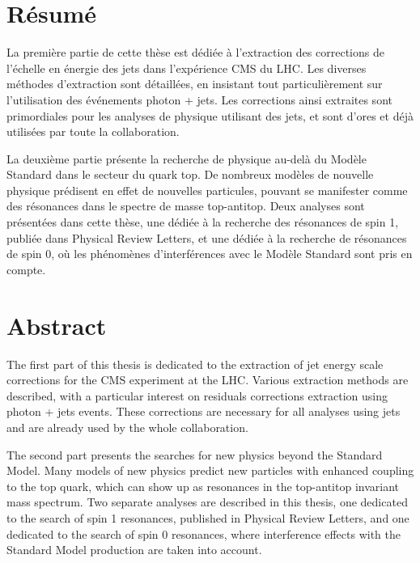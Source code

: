 \begingroup
\let\clearpage\relax
\let\cleardoublepage\relax
\let\cleardoublepage\relax

\chapter*{Résumé}

La première partie de cette thèse est dédiée à l'extraction des corrections de l'échelle en énergie des jets dans l'expérience CMS du LHC. Les diverses méthodes d'extraction sont détaillées, en insistant tout particulièrement sur l'utilisation des événements photon + jets. Les corrections ainsi extraites sont primordiales pour les analyses de physique utilisant des jets, et sont d'ores et déjà utilisées par toute la collaboration.

La deuxième partie présente la recherche de physique au-delà du Modèle Standard dans le secteur du quark top. De nombreux modèles de nouvelle physique prédisent en effet de nouvelles particules, pouvant se manifester comme des résonances dans le spectre de masse top-antitop. Deux analyses sont présentées dans cette thèse, une dédiée à la recherche des résonances de spin 1, publiée dans Physical Review Letters, et une dédiée à la recherche de résonances de spin 0, où les phénomènes d'interférences avec le Modèle Standard sont pris en compte.

\vfill

\chapter*{Abstract}

The first part of this thesis is dedicated to the extraction of jet energy scale corrections for the CMS experiment at the LHC. Various extraction methods are described, with a particular interest on residuals corrections extraction using photon + jets events. These corrections are necessary for all analyses using jets and are already used by the whole collaboration.

The second part presents the searches for new physics beyond the Standard Model. Many models of new physics predict new particles with enhanced coupling to the top quark, which can show up as resonances in the top-antitop invariant mass spectrum. Two separate analyses are described in this thesis, one dedicated to the search of spin 1 resonances, published in Physical Review Letters, and one dedicated to the search of spin 0 resonances, where interference effects with the Standard Model production are taken into account.

\endgroup

\vfill